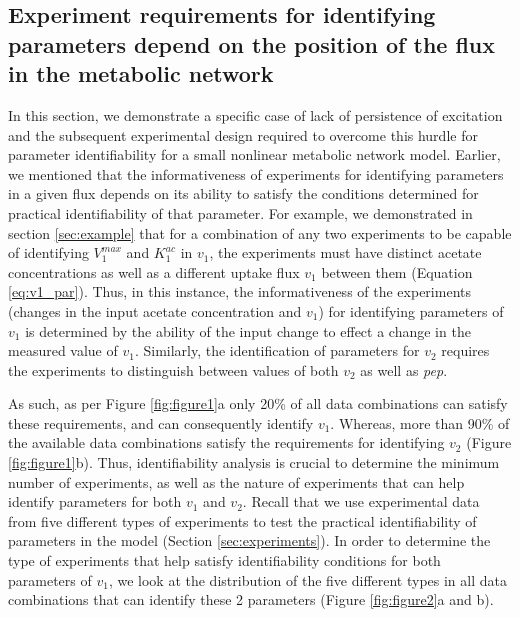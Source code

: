 \documentclass[10pt]{article}
\begin{document}
	\subsection{Experiment requirements for identifying parameters depend on the position of the flux in the metabolic network}\label{sec:experiment_type}	
	In this section, we demonstrate a specific case of lack of persistence of excitation and the subsequent experimental design required to overcome this hurdle for parameter identifiability for a small nonlinear metabolic network model. Earlier, we mentioned that the informativeness of experiments for identifying parameters in a given flux depends on its ability to satisfy the conditions determined for practical identifiability of that parameter. For example, we demonstrated in section \ref{sec:example} that for a combination of any two experiments to be capable of identifying $V_1^{max}$ and $K_1^{ac}$ in $v_1$, the experiments must have distinct acetate concentrations as well as a different uptake flux $v_1$ between them (Equation \ref{eq:v1_par}). Thus, in this instance, the informativeness of the experiments (changes in the input acetate concentration and $v_1$) for identifying parameters of $v_1$ is determined by the ability of the input change to effect a change in the measured value of $v_1$. Similarly, the identification of parameters for $v_2$ requires the experiments to distinguish between values of both $v_2$ as well as \textit{pep}. %
	
	As such, as per Figure \ref{fig:figure1}a only 20\% of all data combinations can satisfy these requirements, and can consequently identify $v_1$. Whereas, more than 90\% of the available data combinations satisfy the requirements for identifying $v_2$ (Figure \ref{fig:figure1}b). Thus, identifiability analysis is crucial to determine the minimum number of experiments, as well as the nature of experiments that can help identify parameters for both $v_1$ and $v_2$. Recall that we use experimental data from five different types of experiments to test the practical identifiability of parameters in the model (Section \ref{sec:experiments}).
	In order to determine the type of experiments that help satisfy identifiability conditions for both parameters of $v_1$, we look at the distribution of the five different types in all data combinations that can identify these 2 parameters (Figure \ref{fig:figure2}a and b).
	
\end{document}
